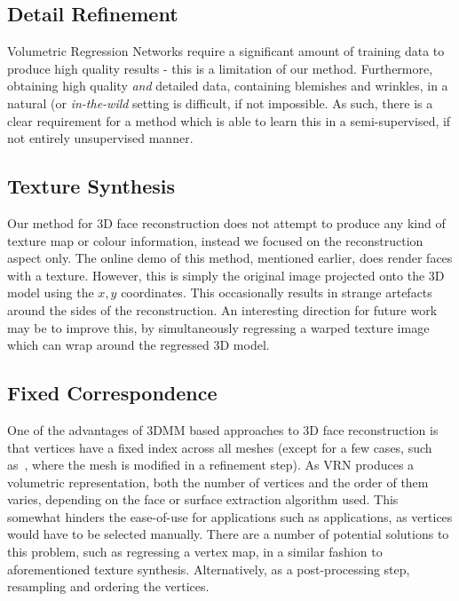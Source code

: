 \subsection{Detail Refinement} %

Volumetric Regression Networks require a significant amount of
training data to produce high quality results - this is a limitation
of our method. Furthermore, obtaining high quality \textit{and}
detailed data, containing blemishes and wrinkles, in a natural (or
\textit{in-the-wild} setting is difficult, if not impossible. As such,
there is a clear requirement for a method which is able to learn this
in a semi-supervised, if not entirely unsupervised manner.

\subsection{Texture Synthesis}

Our method for 3D face reconstruction does not attempt to produce any
kind of texture map or colour information, instead we focused on the
reconstruction aspect only. The online demo of this method, mentioned
earlier, does render faces with a texture. However, this is simply the
original image projected onto the 3D model using the $x,y$
coordinates. This occasionally results in strange artefacts around the
sides of the reconstruction. An interesting direction for future work
may be to improve this, by simultaneously regressing a warped texture
image which can wrap around the regressed 3D model.

\subsection{Fixed Correspondence}

One of the advantages of 3DMM based approaches to 3D face
reconstruction is that vertices have a fixed index across all meshes
(except for a few cases, such as~\cite{tran2018extreme}, where the
mesh is modified in a refinement step). As VRN produces a volumetric
representation, both the number of vertices and the order of them
varies, depending on the face or surface extraction algorithm
used. This somewhat hinders the ease-of-use for applications such as
applications, as vertices would have to be selected manually. There
are a number of potential solutions to this problem, such as
regressing a vertex map, in a similar fashion to aforementioned
texture synthesis. Alternatively, as a post-processing step,
resampling and ordering the vertices.

